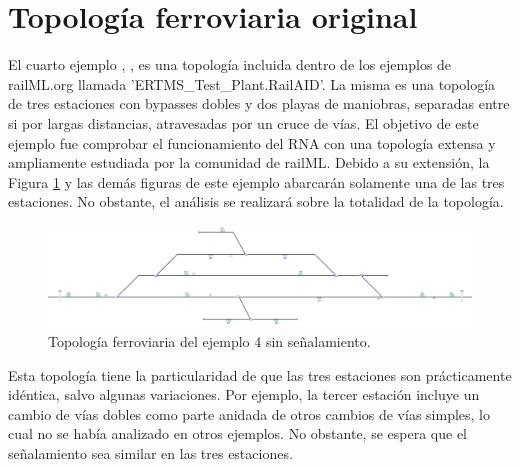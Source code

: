 \section{Topología ferroviaria original}
	
	El cuarto ejemplo , , es una topología incluida dentro de los ejemplos de railML.org llamada 'ERTMS\_Test\_Plant.RailAID'. La misma es una topología de tres estaciones con bypasses dobles y dos playas de maniobras, separadas entre si por largas distancias, atravesadas por un cruce de vías. El objetivo de este ejemplo fue comprobar el funcionamiento del RNA con una topología extensa y ampliamente estudiada por la comunidad de railML. Debido a su extensión, la Figura \ref{fig:EJ4_1} y las demás figuras de este ejemplo abarcarán solamente una de las tres estaciones. No obstante, el análisis se realizará sobre la totalidad de la topología.
	
	\begin{figure}[h]
		\centering
		\includegraphics[width=1\textwidth]{resultados-obtenidos/ejemplo4/images/4_empty.png}
		\centering\caption{Topología ferroviaria del ejemplo 4 sin señalamiento.}
		\label{fig:EJ4_1}
	\end{figure}
	
	Esta topología tiene la particularidad de que las tres estaciones son prácticamente idéntica, salvo algunas variaciones. Por ejemplo, la tercer estación incluye un cambio de vías dobles como parte anidada de otros cambios de vías simples, lo cual no se había analizado en otros ejemplos. No obstante, se espera que el señalamiento sea similar en las tres estaciones.
